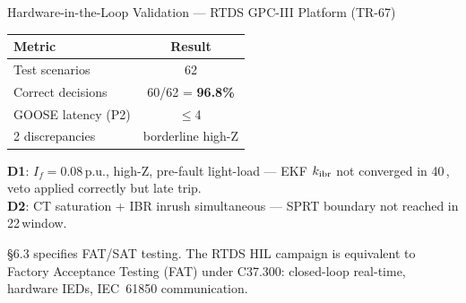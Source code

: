 \documentclass[aspectratio=169, 10pt]{beamer}
\newcommand{\pu}{\,\text{p.u.}}
\newcommand{\ms}{\,\text{ms}}
\newcommand{\kIBR}{k_{\rm ibr}}
\begin{document}
\begin{frame}{Hardware-in-the-Loop Validation --- RTDS GPC-III Platform (TR-67)}
\begin{minipage}[t]{0.42\linewidth}
\begin{tcolorbox}[resultbox, title={HIL Results}]
{\begin{tabular}{lc}
\toprule
\textbf{Metric} & \textbf{Result}\\
\midrule
Test scenarios           & 62\\
Correct decisions        & 60/62 = \textbf{96.8\%}\\
GOOSE latency (P2)       & $\le$4\ms\\
2 discrepancies          & borderline high-Z\\
\bottomrule
\end{tabular}}
\end{tcolorbox}
\vspace{5pt}
{\footnotesize\textbf{D1}: $I_f=0.08\pu$, high-Z, pre-fault light-load --- EKF $\kIBR$ not converged in 40\ms, veto applied correctly but late trip.\\[4pt]
\textbf{D2}: CT saturation + IBR inrush simultaneous --- SPRT boundary not reached in 22\ms window.}
\vspace{5pt}
\begin{tcolorbox}[cpcbox, title={CPC Link --- C37.300 \S6.3}]
{\scriptsize \S6.3 specifies FAT/SAT testing. The RTDS HIL
campaign is equivalent to Factory Acceptance Testing
(FAT) under C37.300: closed-loop real-time, hardware
IEDs, IEC~61850 communication.}
\end{tcolorbox}
\end{minipage}
\end{frame}
\end{document}
